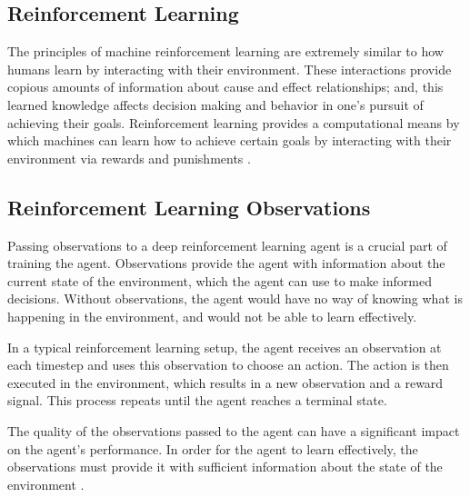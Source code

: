 \documentclass[10pt,twocolumn]{article}
\begin{document}
\subsection{Reinforcement Learning}
The principles of machine reinforcement learning are extremely similar to how humans learn by interacting with their environment. These interactions provide copious amounts of information about cause and effect relationships; and, this learned knowledge affects decision making and behavior in one's pursuit of achieving their goals. Reinforcement learning provides a computational means by which machines can learn how to achieve certain goals by interacting with their environment via rewards and punishments \cite{Sutton1998}.

\subsection{Reinforcement Learning Observations}
Passing observations to a deep reinforcement learning agent is a crucial part of training the agent. Observations provide the agent with information about the current state of the environment, which the agent can use to make informed decisions. Without observations, the agent would have no way of knowing what is happening in the environment, and would not be able to learn effectively.

In a typical reinforcement learning setup, the agent receives an observation at each timestep and uses this observation to choose an action. The action is then executed in the environment, which results in a new observation and a reward signal. This process repeats until the agent reaches a terminal state.

The quality of the observations passed to the agent can have a significant impact on the agent's performance. In order for the agent to learn effectively, the observations must provide it with sufficient information about the state of the environment \cite{brummerloh_2021}.
\end{document}

